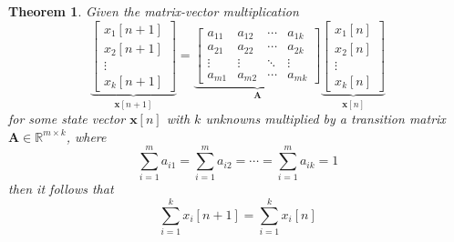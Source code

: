 \documentclass[]{article}
\newtheorem{genthm}{Theorem}
\numberwithin{equation}{section}
\begin{document}
\begin{genthm}
Given the matrix-vector multiplication
\begin{equation}
	\underbrace{\begin{bmatrix}
	x_1[n + 1] \\
	x_2[n + 1] \\
	\vdots \\
	x_k[n + 1]
	\end{bmatrix}}_{\mathbf{x}[n + 1]}
	= 
	\underbrace{\begin{bmatrix}
	a_{11} & a_{12} & \cdots & a_{1k} \\
	a_{21} & a_{22} & \cdots & a_{2k} \\
	\vdots & \vdots & \ddots & \vdots \\
	a_{m1} & a_{m2} & \cdots & a_{mk}
	\end{bmatrix}}_{\mathbf{A}}
	\underbrace{\begin{bmatrix}
	x_1[n] \\
	x_2[n] \\
	\vdots \\
	x_k[n]
	\end{bmatrix}}_{\mathbf{x}[n]}
\end{equation}
for some state vector \(\mathbf{x}[n]\) with \(k\) unknowns multiplied by a transition matrix \(\mathbf{A} \in \mathbb{R}^{m \times k}\), where
\begin{equation}\label{eq:3-e}
	\sum_{i = 1}^{m} a_{i1} = \sum_{i = 1}^{m} a_{i2} = \cdots = \sum_{i = 1}^{m} a_{ik} = 1
\end{equation}
then it follows that 
\begin{equation}
	\sum_{i = 1}^{k} x_i[n + 1] = \sum_{i = 1}^{k} x_i[n]
\end{equation}
\end{genthm}
\end{document}
